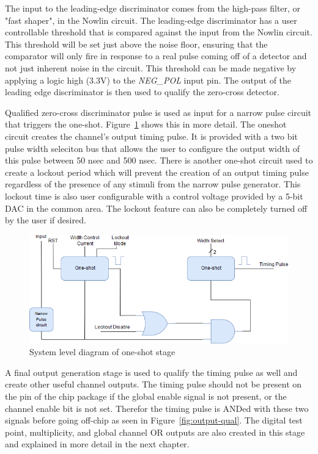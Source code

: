 \documentclass[12pt,oneside,final]{siuethesis}
\theoremstyle{definition}
\begin{document}
\par The input to the leading-edge discriminator comes from the high-pass filter, or "fast shaper", in the Nowlin circuit. The leading-edge discriminator has a user controllable threshold that is compared against the input from the Nowlin circuit. This threshold will be set just above the noise floor, ensuring that the comparator will only fire in response to a real pulse coming off of a detector and not just inherent noise in the circuit. This threshold can be made negative by applying a logic high (3.3V) to the \emph{NEG\_POL} input pin. The output of the leading edge discriminator is then used to qualify the zero-cross detector.

\par Qualified zero-cross discriminator pulse is used as input for a narrow pulse circuit that triggers the one-shot. Figure~\ref{fig:oneshot} shows this in more detail. The oneshot circuit creates the channel's output timing pulse. It is provided with a two bit pulse width seleciton bus that allows the user to configure the output width of this pulse between 50 nsec and 500 nsec. There is another one-shot circuit used to create a lockout period which will prevent the creation of an output timing pulse regardless of the presence of any stimuli from the narrow pulse generator. This lockout time is also user configurable with a control voltage provided by a 5-bit DAC in the common area. The lockout feature can also be completely turned off by the user if desired.

\begin{figure}[h!]
\centering
\includegraphics[scale=.65,keepaspectratio=true]{./ch2_figures/oneshot.png} 
\caption{System level diagram of one-shot stage}
\label{fig:oneshot}
\end{figure}

\par A final output generation stage is used to qualify the timing pulse as well and create other useful channel outputs. The timing pulse should not be present on the pin of the chip package if the global enable signal is not present, or the channel enable bit is not set. Therefor the timing pulse is ANDed with these two signals before going off-chip as seen in Figure~\ref{fig:output-qual}. The digital test point, multiplicity, and global channel OR outputs are also created in this stage and explained in more detail in the next chapter.
\end{document}
